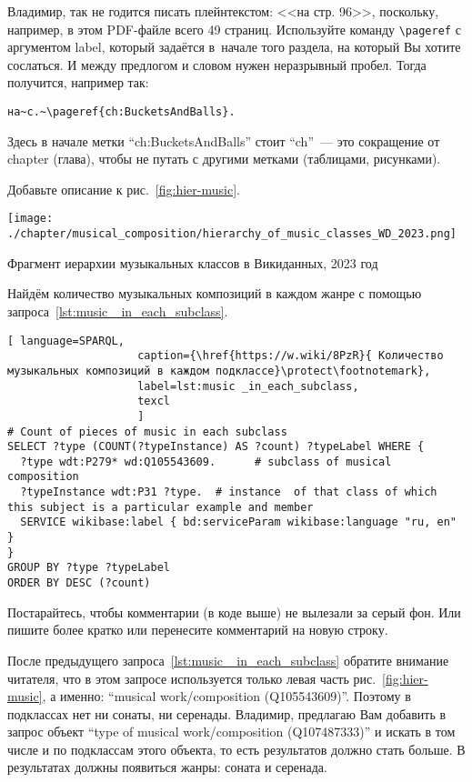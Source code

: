 \TODO Владимир, так не годится писать плейнтекстом: <<на стр. 96>>, 
поскольку, например, в этом PDF-файле всего 49 страниц. 
Используйте команду \verb|\pageref| с аргументом label, 
который задаётся в~начале того раздела, на который Вы хотите сослаться. 
И между предлогом и словом нужен неразрывный пробел. 
Тогда получится, например так: 
\begin{verbatim}
на~с.~\pageref{ch:BucketsAndBalls}. 
\end{verbatim}
Здесь в начале метки ``ch:BucketsAndBalls'' стоит ``ch''~--- это сокращение от chapter (глава), 
чтобы не путать с другими метками (таблицами, рисунками). 


\TODO Добавьте описание к рис.~\ref{fig:hier-music}.
\begin{marginfigure}[0\baselineskip]
	\texttt{[image: ./chapter/musical\_composition/hierarchy\_of\_music\_classes\_WD\_2023.png]}
	\caption[Иерархия музыкальных классов]{Фрагмент иерархии музыкальных классов в Викиданных, 2023 год}%
	\label{fig:hier-music}%
\end{marginfigure}
Найдём количество музыкальных композиций в каждом жанре с помощью запроса~\ref{lst:music _in_each_subclass}.

\begin{lstlisting}[ language=SPARQL,
                    caption={\href{https://w.wiki/8PzR}{ Количество музыкальных композиций в каждом подклассе}\protect\footnotemark},
                    label=lst:music _in_each_subclass,
                    texcl
                    ]
# Count of pieces of music in each subclass
SELECT ?type (COUNT(?typeInstance) AS ?count) ?typeLabel WHERE {
  ?type wdt:P279* wd:Q105543609.      # subclass of musical composition
  ?typeInstance wdt:P31 ?type.  # instance  of that class of which this subject is a particular example and member
  SERVICE wikibase:label { bd:serviceParam wikibase:language "ru, en" }
}
GROUP BY ?type ?typeLabel
ORDER BY DESC (?count)
\end{lstlisting}%

\TODO Постарайтесь, чтобы комментарии (в коде выше) не вылезали за серый фон. 
Или пишите более кратко или перенесите комментарий на новую строку.

\TODO После предыдущего запроса~\ref{lst:music _in_each_subclass} 
обратите внимание читателя, 
что в этом запросе используется только левая часть рис.~\ref{fig:hier-music}, 
а именно:  ``musical work/composition (Q105543609)''. 
Поэтому в подклассах нет ни сонаты, ни серенады. 
Владимир, предлагаю Вам добавить в запрос объект ``type of musical work/composition (Q107487333)'' 
и искать в том числе и по подклассам этого объекта, то есть результатов должно стать больше. 
В результатах должны появиться жанры: соната и серенада.

